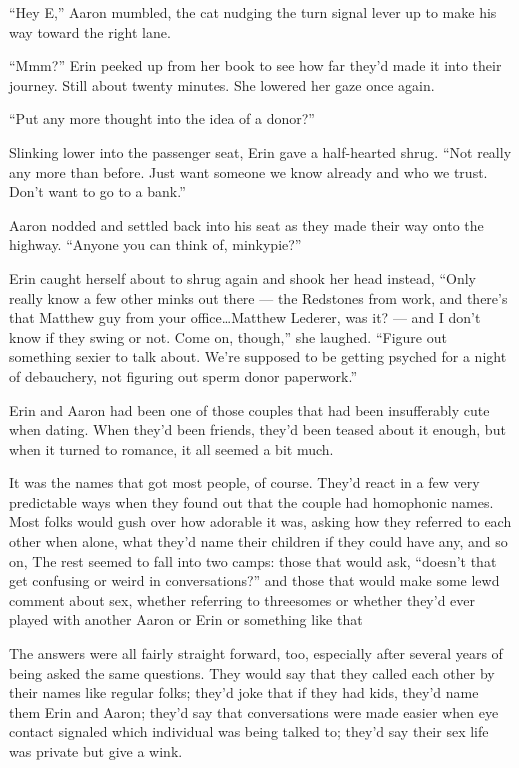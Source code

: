 ``Hey E,'' Aaron mumbled, the cat nudging the turn signal lever up to
make his way toward the right lane.

``Mmm?'' Erin peeked up from her book to see how far they'd made it into
their journey. Still about twenty minutes. She lowered her gaze once
again.

``Put any more thought into the idea of a donor?''

Slinking lower into the passenger seat, Erin gave a half-hearted shrug.
``Not really any more than before. Just want someone we know already and
who we trust. Don't want to go to a bank.''

Aaron nodded and settled back into his seat as they made their way onto
the highway. ``Anyone you can think of, minkypie?''

Erin caught herself about to shrug again and shook her head instead,
``Only really know a few other minks out there --- the Redstones from
work, and there's that Matthew guy from your office\ldots{}Matthew
Lederer, was it? --- and I don't know if they swing or not. Come on,
though,'' she laughed. ``Figure out something sexier to talk about.
We're supposed to be getting psyched for a night of debauchery, not
figuring out sperm donor paperwork.''

Erin and Aaron had been one of those couples that had been insufferably
cute when dating. When they'd been friends, they'd been teased about it
enough, but when it turned to romance, it all seemed a bit much.

It was the names that got most people, of course. They'd react in a few
very predictable ways when they found out that the couple had homophonic
names. Most folks would gush over how adorable it was, asking how they
referred to each other when alone, what they'd name their children if
they could have any, and so on, The rest seemed to fall into two camps:
those that would ask, ``doesn't that get confusing or weird in
conversations?'' and those that would make some lewd comment about sex,
whether referring to threesomes or whether they'd ever played with
another Aaron or Erin or something like that

The answers were all fairly straight forward, too, especially after
several years of being asked the same questions. They would say that
they called each other by their names like regular folks; they'd joke
that if they had kids, they'd name them Erin and Aaron; they'd say that
conversations were made easier when eye contact signaled which
individual was being talked to; they'd say their sex life was private
but give a wink.

